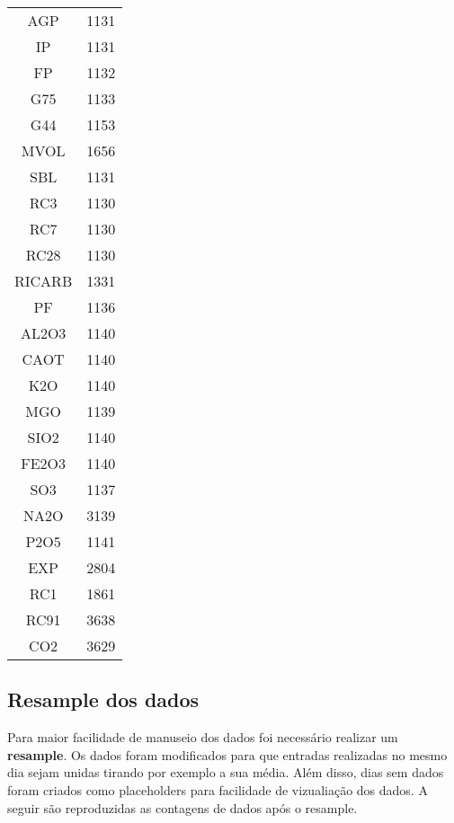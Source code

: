 \begin{center}
\begin{tabular}{ c c }
AGP     &  1131\\
IP      &  1131\\
FP      &  1132\\
G75    &  1133\\
G44   &  1153\\
MVOL    &  1656\\
SBL     &  1131\\
RC3     &  1130\\
RC7     &  1130\\
RC28    &  1130\\
RICARB  &  1331\\
PF      &  1136\\
AL2O3   &  1140\\
CAOT    &  1140\\
K2O     &  1140\\
MGO     &  1139\\
SIO2    &  1140\\
FE2O3   &  1140\\
SO3     &  1137\\
NA2O    &  3139\\
P2O5    &  1141\\
EXP     &  2804\\
RC1     &  1861\\
RC91    &  3638\\
CO2     &  3629 
\end{tabular}
\end{center}





\subsection{Resample dos dados}
Para maior facilidade de manuseio dos dados foi necessário realizar um
\textbf{resample}. Os dados foram modificados para que entradas realizadas no
mesmo dia sejam unidas tirando por exemplo a sua média. Além disso, dias sem dados foram criados como placeholders para facilidade de vizualiação dos dados. A seguir são reproduzidas as contagens de dados após o resample.


